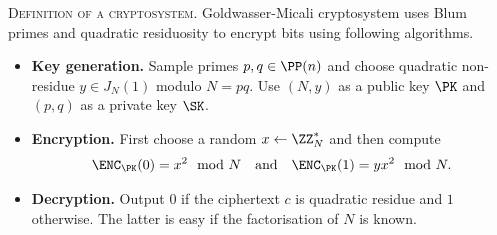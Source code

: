 \documentclass{crypto-exercise}
\begin{document}
\begin{solution}
\vspace*{3ex}
\noindent
\textsc{Definition of a cryptosystem.}
Goldwasser-Micali cryptosystem uses Blum primes and quadratic residuosity to encrypt bits using following algorithms. 
\begin{itemize}
\item \textbf{Key generation.}  Sample primes $p,q\in\PP(n)$ and choose quadratic non-residue $y\in J_N(1)$ modulo $N=pq$. Use $(N,y)$ as a public key $\PK$ and $(p,q)$ as a private key $\SK$.

\item\textbf{Encryption.} First choose a random $x\gets\ZZ_N^*$ and then compute
    \begin{align*}
      \enc{0}=x^2\mod N \quad\text{and}\quad \enc{1}=yx^2\mod N.
    \end{align*}
  \item\textbf{Decryption.} Output $0$ if the ciphertext $c$ is
    quadratic residue and $1$ otherwise. The latter is easy if the
    factorisation of $N$ is known.
\end{itemize}


\end{solution}
\end{document}
